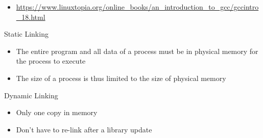 \begin{itemize}
\item \url{https://www.linuxtopia.org/online_books/an_introduction_to_gcc/gccintro_18.html}
\end{itemize}

\begin{frame}
  \begin{block}{Static Linking}
    \begin{itemize}
    \item The entire program and all data of a process must be in physical memory for the
      process to execute
    \item The size of a process is thus limited to the size of physical memory
    \end{itemize}
  \end{block}
    \begin{center}
  \end{center}
\end{frame}

\begin{frame}
  \begin{block}{Dynamic Linking}
    \begin{itemize}
    \item Only one copy in memory
    \item Don't have to re-link after a library update
    \end{itemize}
  \end{block}
  \begin{center}
  \end{center}
\end{frame}

